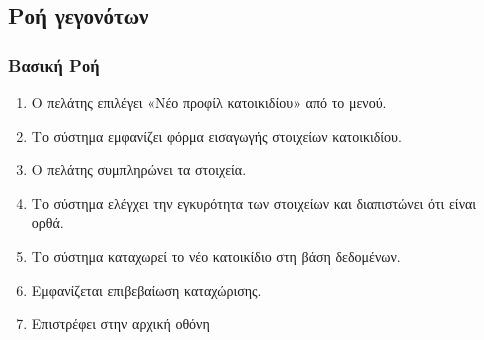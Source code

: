 \documentclass[12pt,a4paper,twoside]{book}
\begin{document}
\subsection{Ροή γεγονότων}

\subsubsection{Βασική Ροή}
\begin{enumerate}
  \item Ο πελάτης επιλέγει «Νέο προφίλ κατοικιδίου» από το μενού.  %
  \item Το σύστημα εμφανίζει φόρμα εισαγωγής στοιχείων κατοικιδίου.  %
  \item Ο πελάτης συμπληρώνει τα στοιχεία.   %
  \item Το σύστημα ελέγχει την εγκυρότητα των στοιχείων και διαπιστώνει ότι είναι ορθά.  %
  \item Το σύστημα καταχωρεί το νέο κατοικίδιο στη βάση δεδομένων.  %
  \item Εμφανίζεται επιβεβαίωση καταχώρισης.  %
  \item Επιστρέφει στην αρχική οθόνη    %
\end{enumerate}
\end{document}
